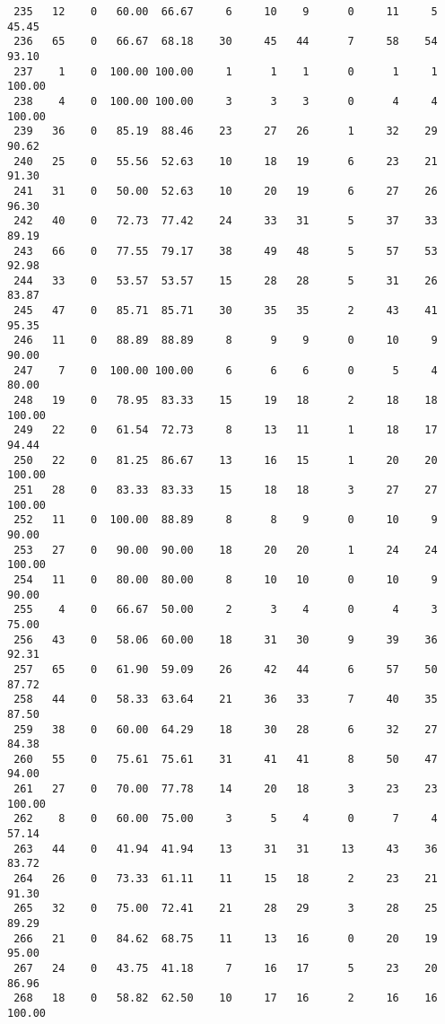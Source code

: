 \begin{verbatim}
 235   12    0   60.00  66.67     6     10    9      0     11     5    45.45
 236   65    0   66.67  68.18    30     45   44      7     58    54    93.10
 237    1    0  100.00 100.00     1      1    1      0      1     1   100.00
 238    4    0  100.00 100.00     3      3    3      0      4     4   100.00
 239   36    0   85.19  88.46    23     27   26      1     32    29    90.62
 240   25    0   55.56  52.63    10     18   19      6     23    21    91.30
 241   31    0   50.00  52.63    10     20   19      6     27    26    96.30
 242   40    0   72.73  77.42    24     33   31      5     37    33    89.19
 243   66    0   77.55  79.17    38     49   48      5     57    53    92.98
 244   33    0   53.57  53.57    15     28   28      5     31    26    83.87
 245   47    0   85.71  85.71    30     35   35      2     43    41    95.35
 246   11    0   88.89  88.89     8      9    9      0     10     9    90.00
 247    7    0  100.00 100.00     6      6    6      0      5     4    80.00
 248   19    0   78.95  83.33    15     19   18      2     18    18   100.00
 249   22    0   61.54  72.73     8     13   11      1     18    17    94.44
 250   22    0   81.25  86.67    13     16   15      1     20    20   100.00
 251   28    0   83.33  83.33    15     18   18      3     27    27   100.00
 252   11    0  100.00  88.89     8      8    9      0     10     9    90.00
 253   27    0   90.00  90.00    18     20   20      1     24    24   100.00
 254   11    0   80.00  80.00     8     10   10      0     10     9    90.00
 255    4    0   66.67  50.00     2      3    4      0      4     3    75.00
 256   43    0   58.06  60.00    18     31   30      9     39    36    92.31
 257   65    0   61.90  59.09    26     42   44      6     57    50    87.72
 258   44    0   58.33  63.64    21     36   33      7     40    35    87.50
 259   38    0   60.00  64.29    18     30   28      6     32    27    84.38
 260   55    0   75.61  75.61    31     41   41      8     50    47    94.00
 261   27    0   70.00  77.78    14     20   18      3     23    23   100.00
 262    8    0   60.00  75.00     3      5    4      0      7     4    57.14
 263   44    0   41.94  41.94    13     31   31     13     43    36    83.72
 264   26    0   73.33  61.11    11     15   18      2     23    21    91.30
 265   32    0   75.00  72.41    21     28   29      3     28    25    89.29
 266   21    0   84.62  68.75    11     13   16      0     20    19    95.00
 267   24    0   43.75  41.18     7     16   17      5     23    20    86.96
 268   18    0   58.82  62.50    10     17   16      2     16    16   100.00

\end{verbatim}
